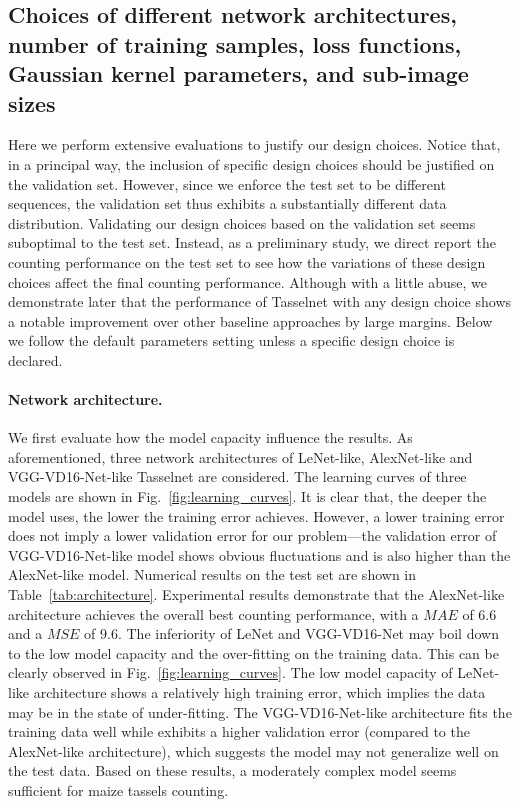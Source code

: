 \documentclass[twocolumn]{bmcart}%
\begin{document}
\subsection*{Choices of different network architectures, number of training samples, loss functions, Gaussian kernel parameters, and sub-image sizes}
%
Here we perform extensive evaluations to justify our design choices. Notice that, in a principal way, the inclusion of specific design choices should be justified on the validation set. However, since we enforce the test set to be different sequences, the validation set thus exhibits a substantially different data distribution. Validating our design choices based on the validation set seems suboptimal to the test set. Instead, as a preliminary study, we direct report the counting performance on the test set to see how the variations of these design choices affect the final counting performance. Although with a little abuse, we demonstrate later that the performance of Tasselnet with any design choice shows a notable improvement over other baseline approaches by large margins. Below we follow the default parameters setting unless a specific design choice is declared.

\paragraph{Network architecture.} We first evaluate how the model capacity influence the results. As aforementioned, three network architectures of LeNet-like, AlexNet-like and VGG-VD16-Net-like Tasselnet are considered. The learning curves of three models are shown in Fig.~\ref{fig:learning_curves}. It is clear that, the deeper the model uses, the lower the training error achieves. However, a lower training error does not imply a lower validation error for our problem---the validation error of VGG-VD16-Net-like model shows obvious fluctuations and is also higher than the AlexNet-like model. Numerical results on the test set are shown in Table~\ref{tab:architecture}. Experimental results demonstrate that the AlexNet-like architecture achieves the overall best counting performance, with a $MAE$ of $6.6$ and a $MSE$ of $9.6$. The inferiority of LeNet and VGG-VD16-Net may boil down to the low model capacity and the over-fitting on the training data. This can be clearly observed in Fig.~\ref{fig:learning_curves}. The low model capacity of LeNet-like architecture shows a relatively high training error, which implies the data may be in the state of under-fitting. The VGG-VD16-Net-like architecture fits the training data well while exhibits a higher validation error (compared to the AlexNet-like architecture), which suggests the model may not generalize well on the test data. Based on these results, a moderately complex model seems sufficient for maize tassels counting.
\end{document}
